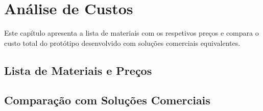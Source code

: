 

\chapter{Análise de Custos}
\label{chapter:costs}

\begin{introduction}
Este capítulo apresenta a lista de materiais com os respetivos preços e compara o custo total do protótipo desenvolvido com soluções comerciais equivalentes.
\end{introduction}



\section{Lista de Materiais e Preços}
\label{sec:lista-materiais}


\section{Comparação com Soluções Comerciais}
\label{sec:comparacao-comercial}

